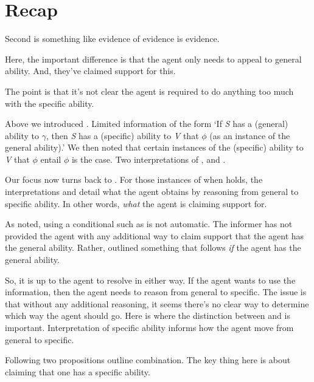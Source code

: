 \section{Recap}
\label{sec:recap-reasoning}

\begin{note}
  Second is something like evidence of evidence is evidence.

  Here, the important difference is that the agent only needs to appeal to general ability.
  And, they've claimed support for this.

  The point is that it's not clear the agent is required to do anything too much with the specific ability.
\end{note}

\begin{note}[Summarising]
  Above we introduced \gsi{}.
  Limited information of the form `If \emph{S} has a (general) ability to \(\gamma\), then \emph{S} has a (specific) ability to \emph{V} that \(\phi\) (as an instance of the general ability).'
  We then noted that certain instances of the (specific) ability to \emph{V} that \(\phi\) entail \(\phi\) is the case.
  Two interpretations of , \AR{} and \WR{}.

  Our focus now turns back to \gsi{}.
  For those instances of \gsi{} when  holds, the interpretations \AR{} and \WR{} detail what the agent obtains by reasoning from general to specific ability.
  In other words, \emph{what} the agent is claiming support for.

  As noted, using a conditional such as \gsi{} is not automatic.
  The informer has not provided the agent with any additional way to claim support that the agent has the general ability.
  Rather, outlined something that follows \emph{if} the agent has the general ability.

  So, it is up to the agent to resolve in either way.
  If the agent wants to use the information, then the agent needs to reason from general to specific.
  The issue is that without any additional reasoning, it seems there's no clear way to determine which way the agent should go.
  Here is where the distinction between \AR{} and \WR{} is important.
  Interpretation of specific ability informs how the agent move from general to specific.

  Following two propositions outline combination.
  {
    \color{red}
    The key thing here is about claiming that one has a specific ability.
  }
\end{note}

